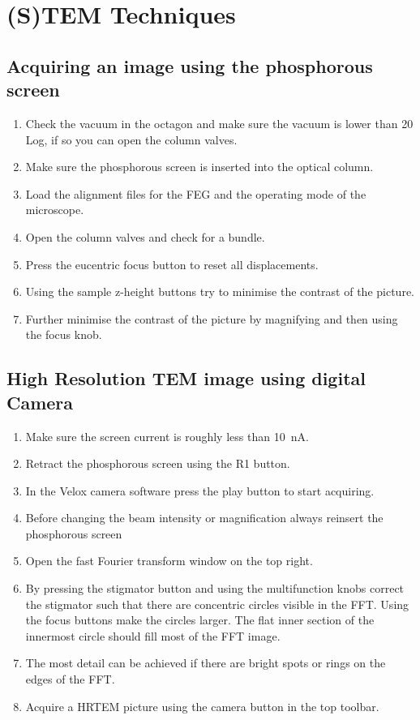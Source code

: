 \documentclass[a4paper]{scrartcl}
\begin{document}
\section*{(S)TEM  Techniques}
\subsection*{Acquiring an image using the phosphorous screen}
\begin{enumerate}
    \item Check the vacuum in the octagon and make sure the vacuum is lower than 20 Log, if so you can open the column valves.
    \item Make sure the phosphorous screen is inserted into the optical column.
    \item Load the alignment files for the FEG and the operating mode of the microscope.
    \item Open the column valves and check for a bundle.
    \item Press the eucentric focus button to reset all displacements.
    \item Using the sample z-height buttons try to minimise the contrast of the picture.
    \item Further minimise the contrast of the picture by magnifying and then using the focus knob.
\end{enumerate}

\subsection*{High Resolution TEM image using digital Camera}
\begin{enumerate}
    \item Make sure the screen current is roughly less than \SI{10}{\nano \ampere}.
    \item Retract the phosphorous screen using the R1 button.
    \item In the Velox camera software press the play button to start acquiring.
    \item Before changing the beam intensity or magnification always reinsert the phosphorous screen
    \item Open the fast Fourier transform window on the top right.
    \item By pressing the stigmator button and using the multifunction knobs correct the stigmator such that there are concentric circles visible in the FFT. Using the focus buttons make the circles larger. The flat inner section of the innermost circle should fill most of the FFT image. 
    \item The most detail can be achieved if there are bright spots or rings on the edges of the FFT.
    \item Acquire a HRTEM picture using the camera button in the top toolbar.
\end{enumerate}
\end{document}
